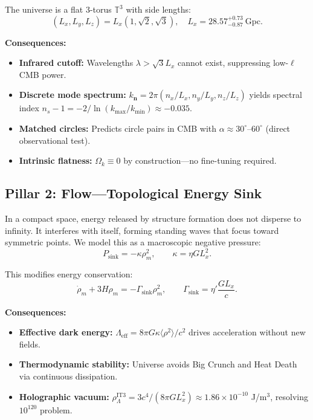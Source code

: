 \documentclass[12pt,a4paper]{article}
\begin{document}
The universe is a flat 3-torus $\mathbb{T}^3$ with side lengths:
\begin{equation}
(L_x, L_y, L_z) = L_x \left(1, \sqrt{2}, \sqrt{3}\right), \quad L_x = 28.57^{+0.73}_{-0.87}~\mathrm{Gpc}.
\end{equation}

\textbf{Consequences:}
\begin{itemize}
    \item \textbf{Infrared cutoff:} Wavelengths $\lambda > \sqrt{3}L_x$ cannot exist, suppressing low-$\ell$ CMB power.
    \item \textbf{Discrete mode spectrum:} $k_{\mathbf{n}} = 2\pi(n_x/L_x, n_y/L_y, n_z/L_z)$ yields spectral index $n_s - 1 = -2/\ln(k_{\max}/k_{\min}) \approx -0.035$.
    \item \textbf{Matched circles:} Predicts circle pairs in CMB with $\alpha \approx 30^\circ\text{--}60^\circ$ (direct observational test).
    \item \textbf{Intrinsic flatness:} $\Omega_k \equiv 0$ by construction---no fine-tuning required.
\end{itemize}

\subsection{Pillar 2: Flow---Topological Energy Sink}

In a compact space, energy released by structure formation does not disperse to infinity. It interferes with itself, forming standing waves that focus toward symmetric points. We model this as a macroscopic negative pressure:
\begin{equation}
P_{\mathrm{sink}} = -\kappa \rho_m^2, \qquad \kappa = \eta G L_x^2.
\end{equation}

This modifies energy conservation:
\begin{equation}
\dot{\rho}_m + 3H\rho_m = -\Gamma_{\mathrm{sink}}\rho_m^2, \qquad \Gamma_{\mathrm{sink}} = \eta' \frac{G L_x}{c}.
\end{equation}

\textbf{Consequences:}
\begin{itemize}
    \item \textbf{Effective dark energy:} $\Lambda_{\mathrm{eff}} = 8\pi G \kappa \langle \rho^2 \rangle/c^2$ drives acceleration without new fields.
    \item \textbf{Thermodynamic stability:} Universe avoids Big Crunch and Heat Death via continuous dissipation.
    \item \textbf{Holographic vacuum:} $\rho_\Lambda^{\mathrm{IT3}} = 3c^4/(8\pi G L_x^2) \approx 1.86 \times 10^{-10}$ J/m$^3$, resolving $10^{120}$ problem.
\end{itemize}
\end{document}
